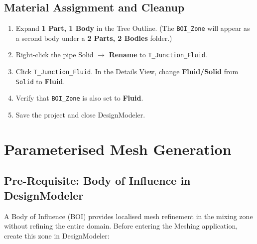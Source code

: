 \documentclass[12pt,a4paper]{report}
\begin{document}
\medskip
\noindent{}


\section{Material Assignment and Cleanup}

\begin{enumerate}
  \item Expand \textbf{1 Part, 1 Body} in the Tree Outline.  (The
        \texttt{BOI\_Zone} will appear as a second body under a
        \textbf{2 Parts, 2 Bodies} folder.)
  \item Right-click the pipe Solid $\rightarrow$ \textbf{Rename} to
        \texttt{T\_Junction\_Fluid}.
  \item Click \texttt{T\_Junction\_Fluid}.  In the Details View, change
        \textbf{Fluid/Solid} from \texttt{Solid} to \textbf{Fluid}.
  \item Verify that \texttt{BOI\_Zone} is also set to \textbf{Fluid}.
  \item Save the project and close DesignModeler.
\end{enumerate}


\chapter{Parameterised Mesh Generation}
\label{ch:mesh}

\section{Pre-Requisite: Body of Influence in DesignModeler}

A Body of Influence (BOI) provides localised mesh refinement in the mixing
zone without refining the entire domain.  Before entering the Meshing
application, create this zone in DesignModeler:
\end{document}
